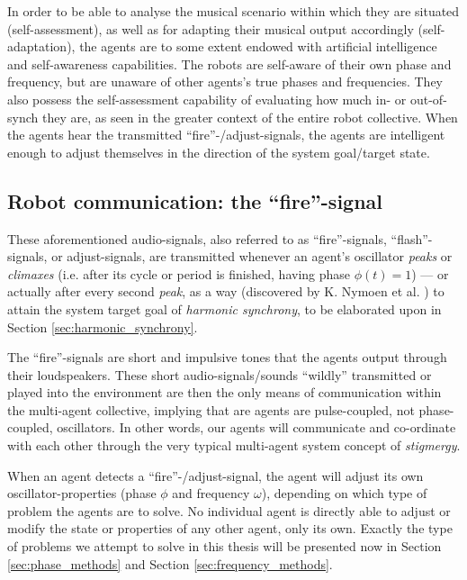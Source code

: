 		In order to be able to analyse the musical scenario within which they are situated (self-assessment), as well as for adapting their musical output accordingly (self-adaptation), the agents are to some extent endowed with artificial intelligence and self-awareness capabilities. The robots are self-aware of their own phase and frequency, but are unaware of other agents's true phases and frequencies. They also possess the self-assessment capability of evaluating how much in- or out-of-synch they are, as seen in the greater context of the entire robot collective. When the agents hear the transmitted ``fire''-/adjust-signals, the agents are intelligent enough to adjust themselves in the direction of the system goal/target state.

		



	\subsection{Robot communication: the ``fire''-signal}
	\label{subsec:fire_signal}
	
	These aforementioned audio-signals, also referred to as ``fire''-signals, ``flash''-signals, or adjust-signals, are transmitted whenever an agent's oscillator \textit{peaks} or \textit{climaxes} (i.e. after its cycle or period is finished, having phase $\phi(t)=1$) — or actually after every second \textit{peak}, as a way (discovered by K. Nymoen et al. \cite{nymoen_synch}) to attain the system target goal of \textit{harmonic synchrony}, to be elaborated upon in Section \ref{sec:harmonic_synchrony}.

	The ``fire''-signals are short and impulsive tones that the agents output through their loudspeakers. These short audio-signals/sounds ``wildly'' transmitted or played into the environment are then the only means of communication within the multi-agent collective, implying that are agents are pulse-coupled, not phase-coupled, oscillators. In other words, our agents will communicate and co-ordinate with each other through the very typical multi-agent system concept of \textit{stigmergy}.
	
	When an agent detects a ``fire''-/adjust-signal, the agent will adjust its own oscillator-properties (phase $\phi$ and frequency $\omega$), depending on which type of problem the agents are to solve. No individual agent is directly able to adjust or modify the state or properties of any other agent, only its own. Exactly the type of problems we attempt to solve in this thesis will be presented now in Section \ref{sec:phase_methods} and Section \ref{sec:frequency_methods}.
	
